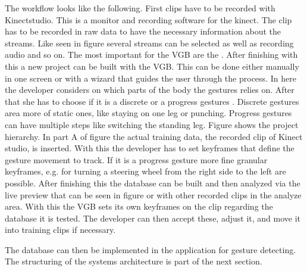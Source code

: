 The workflow looks like the following. First clips have to be recorded with Kinectstudio. This is a monitor and recording software for the kinect. The clip has to be recorded in raw data to have the necessary information about the streams. Like seen in figure  several streams can be selected as well as recording audio and so on. The most important for the VGB are the . After finishing with this a new project can be built with the VGB. This can be done either manually in one screen or with a wizard that guides the user through the process. In here the developer considers on which parts of the body the gestures relies on. After that she has to choose if it is a discrete or a progress gestures . Discrete gestures area more of static ones, like staying on one leg or punching. Progress gestures can have multiple steps like switching the standing leg.
Figure  shows the project hierarchy. In part A of figure  the actual training data, the recorded clip of Kinect studio, is inserted. With this the developer has to set keyframes that define the gesture movement to track. If it is a progress gesture more fine granular keyframes, e.g. for turning a steering wheel from the right side to the left are possible. After finishing this the database can be built and then analyzed via the live preview that can be seen in figure  or with other recorded clips in the analyze area. With this the VGB sets its own keyframes on the clip regarding the database it is tested. The developer can then accept these, adjust it, and move it into training clips if necessary.

The database can then be implemented in the application for gesture detecting. The structuring of the systems architecture is part of the next section.
